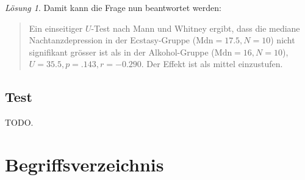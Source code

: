 \documentclass[
]{book}
\theoremstyle{definition}
\theoremstyle{definition}
\theoremstyle{definition}
\theoremstyle{definition}
\theoremstyle{remark}
\newtheorem*{solution}{Lösung}
\begin{document}
\begin{solution}
Damit kann die Frage nun beantwortet werden:

\begin{quote}
Ein einseitiger \(U\)-Test nach Mann und Whitney ergibt, dass die mediane Nachtanzdepression in der Ecstasy-Gruppe (\(\text{Mdn}=17.5, N = 10\)) nicht signifikant grösser ist als in der Alkohol-Gruppe (\(\text{Mdn}= 16, N =10\)), \(U = 35.5, p = .143, r = -0.290\). Der Effekt ist als mittel einzustufen.
\end{quote}

\end{solution}

\section{Test}\label{test-3}

TODO.

\chapter*{Begriffsverzeichnis}\label{begriffsverzeichnis}
\end{document}

